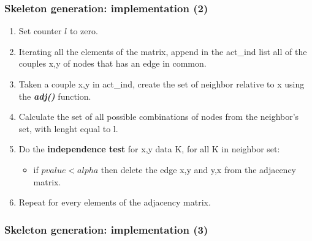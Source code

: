 \documentclass[xcolor ={table,usenames,dvipsnames}]{beamer}
\theoremstyle{definition}
\begin{document}
	\begin{frame}
		\frametitle{Skeleton generation: implementation (2)}
		\begin{enumerate}
			\item Set  counter $l$ to zero.
			\item Iterating all the elements of the matrix, append in the act\_ind list all of the couples x,y of nodes that has an edge in common.
			\item Taken a couple x,y in act\_ind, create the set of neighbor relative to x using the \textit{\textbf{adj()}} function.
			\item Calculate the set of all possible combinations of nodes from the neighbor's set, with lenght equal to l.
			\item Do the \textbf{independence test} for x,y data K, for all K in neighbor set:
			\begin{itemize}
				\item if $pvalue < alpha$ then delete the edge x,y and y,x from the adjacency matrix.
			\end{itemize}
			\item Repeat for every elements of the adjacency matrix.      
		\end{enumerate}
	\end{frame}

	\begin{frame}
		\frametitle{Skeleton generation: implementation (3)}
	\end{frame}

	
\end{document}

